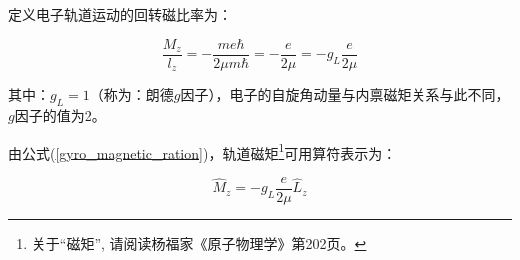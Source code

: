 定义电子轨道运动的回转磁比率为：

\begin{equation}
\frac{{M_z }}{{l_z }} =  - \frac{{me\hbar }}{{2\mu m\hbar }} =  - \frac{e}{{2\mu }} =  - g_L \frac{e}{{2\mu }}
\label{gyro_magnetic_ration}
\end{equation}

其中：$g_L  = 1$（称为：朗德$g$因子），电子的自旋角动量与内禀磁矩关系与此不同，$g$因子的值为2。

由公式(\ref{gyro_magnetic_ration})，轨道磁矩\footnote{关于``磁矩'', 请阅读杨福家《原子物理学》第202页。}可用算符表示为：

\begin{equation}\label{15-16}
\widehat M_z  =  - g_L \frac{e}{{2\mu }}\widehat L_z
\end{equation}



